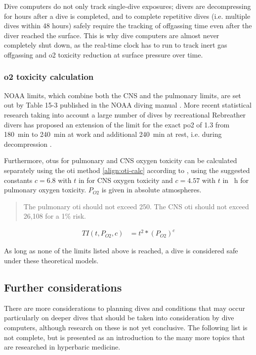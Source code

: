 Dive computers do not only track single-dive exposures; divers are decompressing for hours after a dive is completed, and to complete repetitive dives (i.e. multiple dives within 48 hours) safely require the tracking of offgassing time even after the diver reached the surface.
This is why dive computers are almost never completely shut down, as the real-time clock has to run to track inert gas offgassing and \gls{o2} toxicity reduction at surface pressure over time.

\subsubsection{\gls{o2} toxicity calculation}\label{subsubsection:theory_o2tox_calc}
NOAA limits, which combine both the CNS and the pulmonary limits, are set out by Table 15-3 published in the NOAA diving manual \cite{noaa-diving-manual}. 
More recent statistical research taking into account a large number of dives by recreational Rebreather divers has proposed an extension of the limit for the exact \gls{po2} of \SI{1.3}{\Bar} from \SI{180}{\minute} to \SI{240}{\minute} at work and additional \SI{240}{\minute} at rest, i.e. during decompression \cite{RevisedO2Tox2025}.

Furthermore, \gls{otu}s for pulmonary and CNS oxygen toxicity can be calculated separately using the \gls{oti} method \ref{align:oti-calc} according to \cite{calculated-risk-pulmonary-cns}, using the suggested constants $c=6.8$ with $t$ in \SI{}{\min} for CNS oxygen toxicity and $c=4.57$ with $t$ in \SI{}{\hour} for pulmonary oxygen toxicity. $P_{O2}$ is given in absolute atmospheres.

\begin{quote}
The pulmonary \gls{oti} should not exceed 250. The CNS \gls{oti} should not exceed 26,108 for a 1\% risk.\hfill\cite{calculated-risk-pulmonary-cns}
\end{quote}

\begin{align}
    TI(t, P_{O2}, c) &= t^2 * (P_{O2})^c \label{align:oti-calc}
\end{align}

As long as none of the limits listed above is reached, a dive is considered safe under these theoretical models.

\subsection{Further considerations}
There are more considerations to planning dives and conditions that may occur particularly on deeper dives that should be taken into consideration by dive computers, although research on these is not yet conclusive. 
The following list is not complete, but is presented as an introduction to the many more topics that are researched in hyperbaric medicine.

